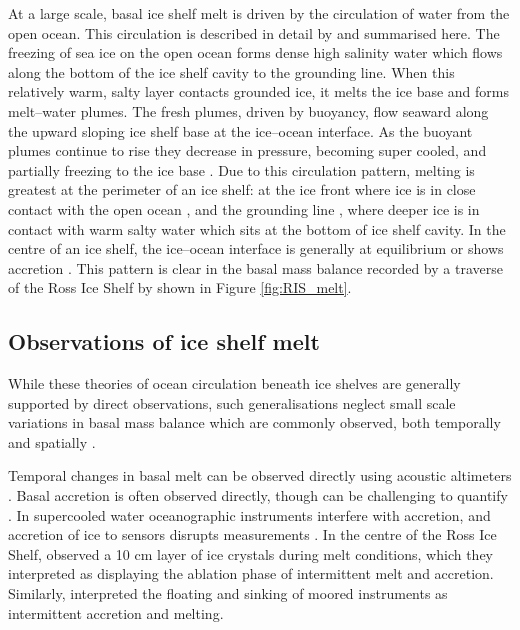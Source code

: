 At a large scale, basal  ice shelf melt is driven by the circulation of water from the open ocean. This circulation is described in detail by \cite{jacobs1992melting} and summarised here. The freezing of sea ice on the open ocean forms dense high salinity water which flows along the bottom of the  ice shelf cavity to the grounding line. When this relatively warm, salty layer contacts grounded ice, it melts the ice base and forms melt--water plumes. The fresh plumes, driven by buoyancy, flow seaward along the upward sloping  ice shelf base at the ice--ocean interface. As the buoyant plumes continue to rise they decrease in pressure, becoming super cooled, and partially freezing to the ice base \citep{lewis1986ice}.  
Due to this circulation pattern, melting is greatest at the perimeter of an  ice shelf: at the ice front where ice is in close contact with the open ocean \citep[e.g.][] {goldberg2019accurately}, and the grounding line \citep[e.g.][] {mankoff2012role}, where deeper ice is in contact with warm salty water which sits at the bottom of  ice shelf cavity. In the centre of an  ice shelf, the ice--ocean interface is generally at equilibrium or shows accretion \citep[e.g.][] {rignot2013ice}. This pattern is clear in the basal mass balance recorded by a traverse of the Ross Ice Shelf by \cite{snodgrass2021melting} shown in Figure \ref{fig:RIS_melt}.

\subsection{Observations of  ice shelf melt}
While these theories of ocean circulation beneath ice shelves are generally supported by direct observations, such generalisations neglect small scale variations in basal mass balance which are commonly observed, both temporally \citep[e.g.][]{stewart2018ice} and spatially \citep[e.g.][]{marsh2016high}.


Temporal changes in basal melt can be observed directly using acoustic altimeters \citep[e.g.][]{stewart2018ice}. Basal accretion is often observed directly, though can be challenging to quantify \citep{vavnkova2020observations}. In supercooled water oceanographic instruments interfere with accretion, and accretion of ice to sensors disrupts measurements \citep{robinson2020ice}.   In the centre of the Ross Ice Shelf, \cite{stevens2020ocean} observed a 10 cm layer of ice crystals during melt conditions, which they interpreted as displaying the ablation phase of intermittent melt and accretion.  Similarly, \cite{craven2014platelet} interpreted the floating and sinking of moored instruments as intermittent accretion and melting.

